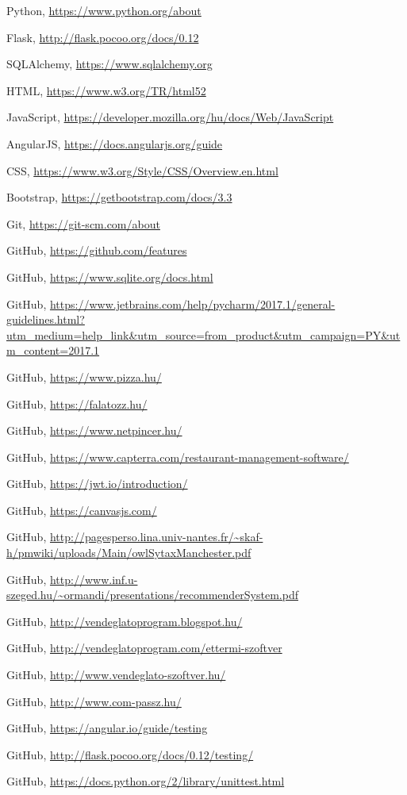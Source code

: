 \begin{thebibliography}{x}

Python, \url{https://www.python.org/about}

Flask, \url{http://flask.pocoo.org/docs/0.12}

SQLAlchemy, \url{https://www.sqlalchemy.org}

HTML, \url{https://www.w3.org/TR/html52}

JavaScript, \url{https://developer.mozilla.org/hu/docs/Web/JavaScript}

AngularJS, \url{https://docs.angularjs.org/guide}

CSS, \url{https://www.w3.org/Style/CSS/Overview.en.html}

Bootstrap, \url{https://getbootstrap.com/docs/3.3}

Git, \url{https://git-scm.com/about}

GitHub, \url{https://github.com/features}

GitHub, \url{https://www.sqlite.org/docs.html}

GitHub, \url{https://www.jetbrains.com/help/pycharm/2017.1/general-guidelines.html?utm_medium=help_link&utm_source=from_product&utm_campaign=PY&utm_content=2017.1}


GitHub, \url{https://www.pizza.hu/}

GitHub, \url{https://falatozz.hu/}

GitHub, \url{https://www.netpincer.hu/}

GitHub, \url{https://www.capterra.com/restaurant-management-software/}

GitHub, \url{https://jwt.io/introduction/}

GitHub, \url{https://canvasjs.com/}

GitHub, \url{http://pagesperso.lina.univ-nantes.fr/~skaf-h/pmwiki/uploads/Main/owlSytaxManchester.pdf}

GitHub, \url{http://www.inf.u-szeged.hu/~ormandi/presentations/recommenderSystem.pdf}

GitHub, \url{http://vendeglatoprogram.blogspot.hu/}

GitHub, \url{http://vendeglatoprogram.com/ettermi-szoftver}

GitHub, \url{http://www.vendeglato-szoftver.hu/}

GitHub, \url{http://www.com-passz.hu/}

GitHub, \url{https://angular.io/guide/testing}

GitHub, \url{http://flask.pocoo.org/docs/0.12/testing/}

GitHub, \url{https://docs.python.org/2/library/unittest.html}


\end{thebibliography}
